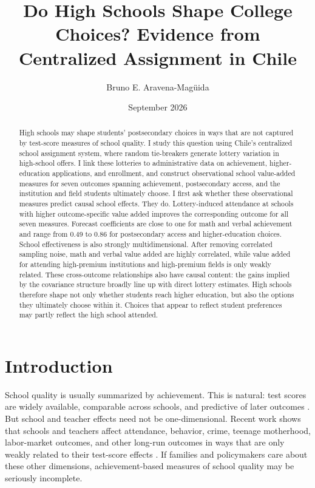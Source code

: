 \documentclass[a4paper, article, english, oneside, unknownkeysallowed, 12pt]{memoir}
\title{Do High Schools Shape College Choices? Evidence from Centralized Assignment in Chile}
\author{ Bruno E. Aravena-Magüida}
\date{September 2026}
\begin{document}
\maketitle



\begin{abstract}

High schools may shape students' postsecondary choices in ways that are not captured by test-score measures of school quality. 
I study this question using Chile's centralized school assignment system, where random tie-breakers generate lottery variation in high-school offers. 
I link these lotteries to administrative data on achievement, higher-education applications, and enrollment, and construct observational school value-added measures for seven outcomes spanning achievement, postsecondary access, and the institution and field students ultimately choose.
I first ask whether these observational measures predict causal school effects. 
They do.  Lottery-induced attendance at schools with higher outcome-specific value added improves the corresponding outcome for all seven measures. 
Forecast coefficients are close to one for math and verbal achievement and range from 0.49 to 0.86 for postsecondary access and higher-education choices.
School effectiveness is also strongly multidimensional. After removing correlated sampling noise, math and verbal value added are highly correlated, while value added for attending high-premium institutions and high-premium fields is only weakly related. 
These cross-outcome relationships also have causal content: the gains implied by the covariance structure broadly line up with direct lottery estimates.
High schools therefore shape not only whether students reach higher education, but also the options they ultimately choose within it. Choices that appear to reflect student preferences may partly reflect the high school attended.

\end{abstract}

\setcounter{tocdepth}{2}
\renewcommand\contentsname{}

\clearpage

 
\section{Introduction}
\label{sec:intro}
 
School quality is usually summarized by achievement.
This is natural: test scores are widely available, comparable across schools, and predictive of later outcomes \parencite{chetty_how_2011}.
But school and teacher effects need not be one-dimensional.
Recent work shows that schools and teachers affect attendance, behavior, crime, teenage motherhood, labor-market outcomes, and other long-run outcomes in ways that are only weakly related to their test-score effects \parencite{jackson_what_2018, beuermann_what_2023, rose_effects_2022, angrist_methods_2023}.
If families and policymakers care about these other dimensions, achievement-based measures of school quality may be seriously incomplete.
 
\end{document}
